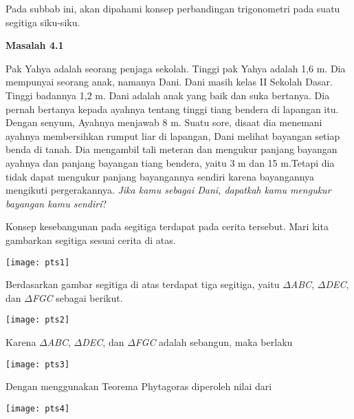 \documentclass[11pt,fleqn]{book} %
\begin{document}
\begin{myEnumerate}
\begin{itemize}
\noindent 

\noindent Pada subbab ini, akan dipahami konsep perbandingan trigonometri pada suatu segitiga siku-siku.

\noindent 

\noindent \textbf{Masalah 4.1}

\noindent \textbf{}

\noindent Pak Yahya adalah seorang penjaga sekolah. Tinggi pak Yahya adalah 1,6 m. Dia mempunyai seorang anak, namanya Dani. Dani masih kelas II Sekolah Dasar. Tinggi badannya 1,2 m. Dani adalah anak yang baik dan suka bertanya. Dia pernah bertanya kepada ayahnya tentang tinggi tiang bendera di lapangan itu. Dengan senyum, Ayahnya menjawab 8 m. Suatu sore, disaat dia menemani ayahnya membersihkan rumput liar di lapangan, Dani melihat bayangan setiap benda di tanah. Dia mengambil tali meteran dan mengukur panjang bayangan ayahnya dan panjang bayangan tiang bendera, yaitu 3 m dan 15 m.Tetapi dia tidak dapat mengukur panjang bayangannya sendiri karena bayangannya mengikuti pergerakannya. \textit{Jika kamu sebagai Dani, dapatkah} \textit{kamu mengukur bayangan kamu sendiri}?

\noindent Konsep kesebangunan pada segitiga terdapat pada cerita tersebut. Mari kita gambarkan segitiga sesuai cerita di atas.

\noindent 

\noindent \texttt{[image: pts1]}

\noindent Berdasarkan gambar segitiga di atas terdapat tiga segitiga, yaitu $\Delta$\textit{ABC}, $\Delta$\textit{DEC}, dan $\Delta$\textit{FGC }sebagai berikut.

\noindent 

\noindent \texttt{[image: pts2]}

\noindent 

\noindent Karena $\Delta$\textit{ABC}, $\Delta$\textit{DEC}, dan $\Delta$\textit{FGC }adalah sebangun, maka berlaku

\noindent 

\noindent \texttt{[image: pts3]}

\noindent 

\noindent Dengan menggunakan Teorema Phytagoras diperoleh nilai dari

\noindent 

\noindent \texttt{[image: pts4]}


\end{itemize}
\end{myEnumerate}
\end{document}
